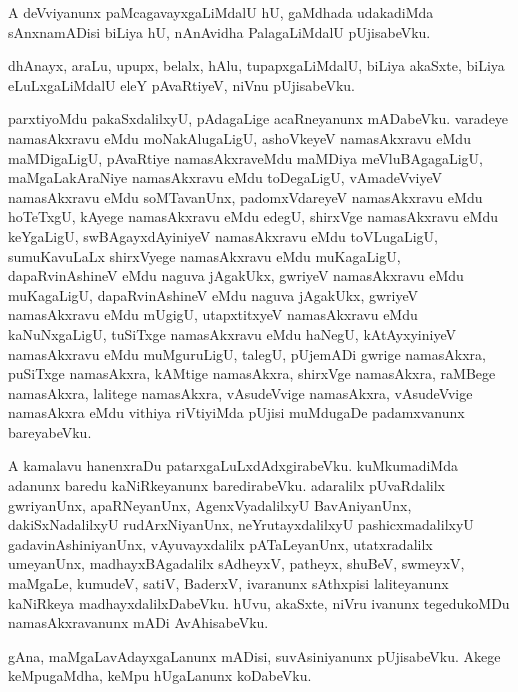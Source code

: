 \documentclass{article}
\begin{document}
\begin{mn}
A  deVviyanunx  paMcagavayxgaLiMdalU  hU, gaMdhada  udakadiMda  sAnxnamADisi  biLiya  hU, nAnAvidha  
PalagaLiMdalU  pUjisabeVku.
\end{mn}

\begin{mn}
dhAnayx,  araLu,  upupx,  belalx,  hAlu,  tupapxgaLiMdalU,  biLiya  akaSxte,  biLiya  eLuLxgaLiMdalU  
eleY  pAvaRtiyeV,  niVnu  pUjisabeVku. 
\end{mn}

\begin{mn}
parxtiyoMdu  pakaSxdalilxyU,  pAdagaLige  acaRneyanunx  mADabeVku.  varadeye  namasAkxravu  eMdu  
moNakAlugaLigU,  ashoVkeyeV  namasAkxravu  eMdu  maMDigaLigU,  pAvaRtiye  namasAkxraveMdu  maMDiya  
meVluBAgagaLigU,  maMgaLakAraNiye  namasAkxravu  eMdu  toDegaLigU,  vAmadeVviyeV  namasAkxravu  eMdu  
soMTavanUnx,  padomxVdareyeV  namasAkxravu  eMdu  hoTeTxgU, kAyege  namasAkxravu  eMdu  edegU,  
shirxVge  namasAkxravu  eMdu  keYgaLigU,  swBAgayxdAyiniyeV  namasAkxravu  eMdu  toVLugaLigU,  
sumuKavuLaLx  shirxVyege  namasAkxravu  eMdu  muKagaLigU,  dapaRvinAshineV  eMdu  naguva  jAgakUkx,  
gwriyeV  namasAkxravu  eMdu  muKagaLigU,  dapaRvinAshineV  eMdu  naguva  jAgakUkx,  gwriyeV  
namasAkxravu  eMdu  mUgigU,  utapxtitxyeV  namasAkxravu  eMdu  kaNuNxgaLigU,  tuSiTxge  namasAkxravu  eMdu  
haNegU,  kAtAyxyiniyeV  namasAkxravu  eMdu  muMguruLigU,  talegU,  pUjemADi  gwrige  namasAkxra,  puSiTxge  
namasAkxra,  kAMtige  namasAkxra,  shirxVge  namasAkxra,  raMBege  namasAkxra,  lalitege  namasAkxra,  vAsudeVvige  
namasAkxra,  vAsudeVvige  namasAkxra  eMdu  vithiya  riVtiyiMda  pUjisi  muMdugaDe  padamxvanunx  bareyabeVku. 
\end{mn}

\begin{mn}
A  kamalavu  hanenxraDu  patarxgaLuLxdAdxgirabeVku.  kuMkumadiMda  adanunx  baredu  kaNiRkeyanunx  
baredirabeVku.  adaralilx  pUvaRdalilx  gwriyanUnx,  apaRNeyanUnx,  AgenxVyadalilxyU  BavAniyanUnx,  
dakiSxNadalilxyU  rudArxNiyanUnx,  neYrutayxdalilxyU  pashicxmadalilxyU  gadavinAshiniyanUnx,  
vAyuvayxdalilx  pATaLeyanUnx,  utatxradalilx  umeyanUnx,  madhayxBAgadalilx  sAdheyxV,  patheyx,  
shuBeV,  swmeyxV,  maMgaLe,  kumudeV,  satiV,  BaderxV,  ivaranunx  sAthxpisi  laliteyanunx  kaNiRkeya  
madhayxdalilxDabeVku.  hUvu,  akaSxte,  niVru  ivanunx  tegedukoMDu  namasAkxravanunx  mADi  AvAhisabeVku.
\end{mn}

\begin{mn}
gAna,  maMgaLavAdayxgaLanunx mADisi,  suvAsiniyanunx  pUjisabeVku.  Akege  keMpugaMdha,  keMpu  hUgaLanunx  koDabeVku.
\end{mn}
\end{document}
